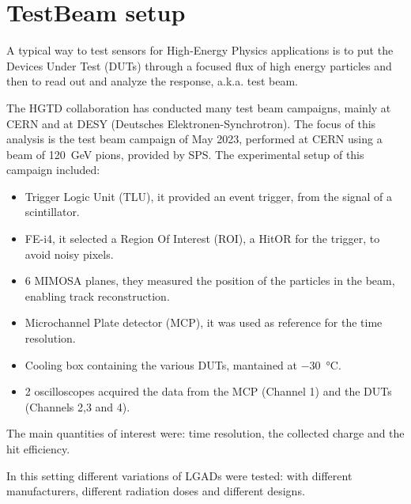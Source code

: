 \chapter{TestBeam setup}

A typical way to test sensors for High-Energy Physics applications is to put the Devices Under Test (DUTs) through a focused flux of high energy particles and then to read out and analyze the response, a.k.a. test beam.

The HGTD collaboration has conducted many test beam campaigns, mainly at CERN and at DESY (Deutsches Elektronen-Synchrotron). The focus of this analysis is the test beam campaign of May 2023, performed at CERN using a beam of \qty{120}{\giga\electronvolt} pions, provided by SPS.
The experimental setup of this campaign included: 
\begin{itemize}
    \item Trigger Logic Unit (TLU), it provided an event trigger, from the signal of a scintillator. %
    \item FE-i4, it selected a Region Of Interest (ROI), a HitOR for the trigger, to avoid noisy pixels.
    \item 6 MIMOSA planes, they measured the position of the particles in the beam, enabling track reconstruction.
    \item Microchannel Plate detector (MCP), it was used as reference for the time resolution.
    \item Cooling box containing the various DUTs, mantained at \qty{-30}{\degreeCelsius}.
    \item 2 oscilloscopes acquired the data from the MCP (Channel 1) and the DUTs (Channels 2,3 and 4).
\end{itemize}

The main quantities of interest were: time resolution, the collected charge and the hit efficiency.

In this setting different variations of LGADs were tested: with different manufacturers, different radiation doses and different designs.


